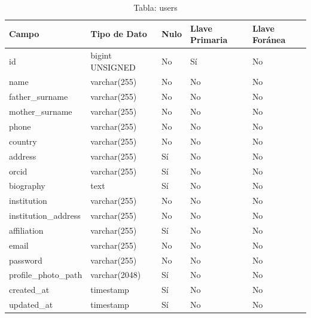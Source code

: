 \begin{table}[H]
    \centering
    \begin{tabular}{|p{5cm}|p{3cm}|p{1cm}|p{2cm}|p{2cm}|}
        \hline
        \textbf{Campo} & \textbf{Tipo de Dato} & \textbf{Nulo} & \textbf{Llave Primaria} & \textbf{Llave Foránea} \\
        \hline
        id & bigint UNSIGNED & No & Sí & No \\
        name & varchar(255) & No & No & No \\
        father\_surname & varchar(255) & No & No & No \\
        mother\_surname & varchar(255) & No & No & No \\
        phone & varchar(255) & No & No & No \\
        country & varchar(255) & No & No & No \\
        address & varchar(255) & Sí & No & No \\
        orcid & varchar(255) & Sí & No & No \\
        biography & text & Sí & No & No \\
        institution & varchar(255) & No & No & No \\
        institution\_address & varchar(255) & No & No & No \\
        affiliation & varchar(255) & Sí & No & No \\
        email & varchar(255) & No & No & No \\
        password & varchar(255) & No & No & No \\
        profile\_photo\_path & varchar(2048) & Sí & No & No \\
        created\_at & timestamp & Sí & No & No \\
        updated\_at & timestamp & Sí & No & No \\
        \hline
    \end{tabular}
    \caption{Tabla: users}
    \label{tab:users}
\end{table}

